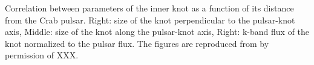 \label{fig:knotcorr}
Correlation between parameters of the inner knot as a function of its distance from the Crab pulsar. Right: size of the knot perpendicular to the pulsar-knot axis, Middle: size of the knot along the pulsar-knot axis, Right: k-band flux of the knot normalized to the pulsar flux. The figures are reproduced from \citet{rudy2015} by permission of XXX.